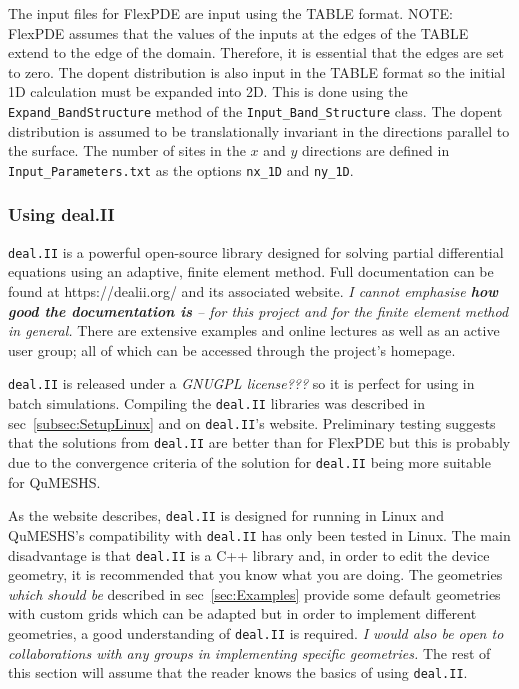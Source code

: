 \documentclass[12pt]{article}
\newcommand{\red}[1]{{\color{red} \it #1}}
\begin{document}
The input files for FlexPDE are input using the TABLE format.  {\color{red} NOTE:}
FlexPDE assumes that the values of the inputs at the edges of the TABLE extend
to the edge of the domain.  Therefore, it is essential that the edges are set to zero.
The dopent distribution is also input in the TABLE format so the initial 1D
calculation must be expanded into 2D.  This is done using the \texttt{Expand\_BandStructure}
method of the \texttt{Input\_Band\_Structure} class.  The dopent distribution is assumed
to be translationally invariant in the directions parallel to the surface.  The number
of sites in the $x$ and $y$ directions are defined in \texttt{Input\_Parameters.txt} as
the options \texttt{nx\_1D} and \texttt{ny\_1D}.


\subsubsection{Using deal.II}
\label{subsubsec:UsingdealII}

\texttt{deal.II} is a powerful open-source library designed for solving partial differential
equations using an adaptive, finite element method.  Full documentation can be found at
https://dealii.org/ and its associated website.  \emph{I cannot emphasise {\bf how good the
documentation is} -- for this project and for the finite element method in general.}  There are
extensive examples and online lectures as well as an active user group; all of which can
be accessed through the project's homepage.

\texttt{deal.II} is released under a \red{GNUGPL license???} so it is perfect for using in
batch simulations.  Compiling the \texttt{deal.II} libraries was described in
sec~\ref{subsec:SetupLinux} and on \texttt{deal.II}'s website.  Preliminary testing
suggests that the solutions from \texttt{deal.II} are better than for FlexPDE but this
is probably due to the convergence criteria of the solution for \texttt{deal.II} being
more suitable for QuMESHS.

As the website describes, \texttt{deal.II} is designed for running in Linux and QuMESHS's
compatibility with \texttt{deal.II} has only been tested in Linux.  The main disadvantage is
that \texttt{deal.II} is a C++ library and, in order to edit the device geometry, it is
recommended that you know what you are doing.  The geometries \red{which should be} described
in sec~\ref{sec:Examples} provide some default geometries with custom grids which can be
adapted but in order to implement different geometries, a good understanding of
\texttt{deal.II} is required.  \red{I would also be open to collaborations with any groups
in implementing specific geometries.}  The rest of this section will assume that the
reader knows the basics of using \texttt{deal.II}.
\end{document}
